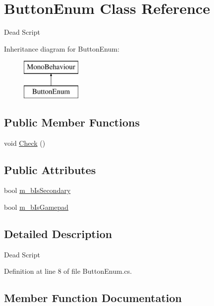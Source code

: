 \hypertarget{class_button_enum}{}\section{Button\+Enum Class Reference}
\label{class_button_enum}


Dead Script  


Inheritance diagram for Button\+Enum\+:\begin{figure}[H]
\begin{center}
\leavevmode
\includegraphics[height=2.000000cm]{class_button_enum}
\end{center}
\end{figure}
\subsection*{Public Member Functions}
\begin{DoxyCompactItemize}
\item 
void \mbox{\hyperlink{class_button_enum_a9bdb998aa15326730b8b1c3c14f1e779}{Check}} ()
\end{DoxyCompactItemize}
\subsection*{Public Attributes}
\begin{DoxyCompactItemize}
\item 
bool \mbox{\hyperlink{class_button_enum_affdb4fb80373e8ae1c344afc4c37a3f3}{m\+\_\+b\+Is\+Secondary}}
\item 
bool \mbox{\hyperlink{class_button_enum_aff6d2a6526780ba222f4ac2aebbc7af0}{m\+\_\+b\+Is\+Gamepad}}
\end{DoxyCompactItemize}


\subsection{Detailed Description}
Dead Script 



Definition at line 8 of file Button\+Enum.\+cs.



\subsection{Member Function Documentation}
\mbox{\label{class_button_enum_a9bdb998aa15326730b8b1c3c14f1e779}} 
